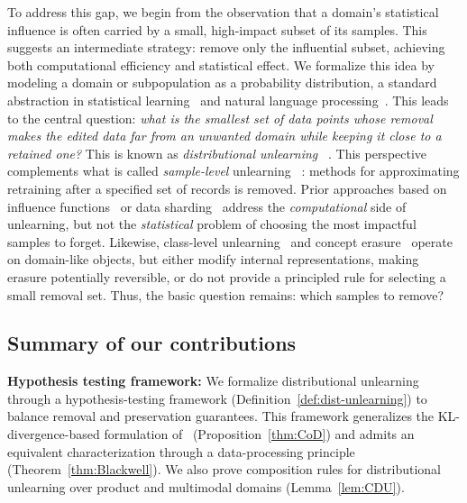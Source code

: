 \vspace{-1 mm}
To address this gap, we begin from the observation that a domain’s statistical influence is often carried by a small, high-impact subset of its samples. This suggests an intermediate strategy: remove only the influential subset, achieving both computational efficiency and statistical effect. We formalize this idea by modeling a domain or subpopulation as a probability distribution, a standard abstraction in statistical learning~\citep{shalev2014understanding} and natural language processing~\citep{blei2003latent,srivastava2017autoencoding}. This leads to the central question: \emph{what is the smallest set of data points whose removal makes the edited data far from an unwanted domain while keeping it close to a retained one?} This is known as \emph{distributional unlearning} ~\citep{allouah2025distributionalmachineunlearningselective}. This perspective complements what is called \emph{sample-level} unlearning ~\citep{pandey2026gaussian}: methods for approximating retraining after a specified set of records is removed. Prior approaches based on influence functions~\citep{guo2020certified} or data sharding~\hbox{\citep{bourtoule2021machine}} address the \emph{computational} side of unlearning, but not the \emph{statistical} problem of choosing the most impactful samples to forget. Likewise, class-level unlearning~\citep{tarun2023fast,kodge2024deep} and concept erasure~\citep{ravfogel2020null,belrose2023leace} operate on domain-like objects, but either modify internal representations, making erasure potentially reversible, or do not provide a principled rule for selecting a small removal set. Thus, the basic question remains: which samples to remove?



\vspace{-4mm}
\subsection{Summary of our contributions} \label{ssec:contribution}
\vspace{-2mm}



\textbf{Hypothesis testing framework:}
We formalize distributional unlearning through a hypothesis-testing framework
(Definition~\ref{def:dist-unlearning}) to balance removal and preservation guarantees. This framework generalizes the KL-divergence-based
formulation of~\citet{allouah2025distributionalmachineunlearningselective} (Proposition~\ref{thm:CoD}) and admits an equivalent characterization through a
data-processing principle (Theorem~\ref{thm:Blackwell}). We also prove composition rules for distributional unlearning over product and multimodal domains (Lemma~\ref{lem:CDU}).




